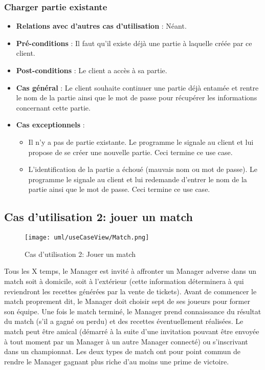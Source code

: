 \documentclass[a4paper,titlepage]{scrreprt}
\begin{document}
    \subsubsection{Charger partie existante}
      \begin{itemize}
        \item \textbf{Relations avec d'autres cas d'utilisation}  : Néant.
        \item \textbf{Pré-conditions} : Il faut qu’il existe déjà une partie à laquelle créée par ce client.
        \item \textbf{Post-conditions} : Le client a accès à sa partie.
        \item \textbf{Cas général} : Le client souhaite continuer une partie déjà entamée et rentre le nom de la partie ainsi que le mot de passe pour récupérer les informations concernant cette partie.
        \item \textbf{Cas exceptionnels} :
          \begin{itemize}
            \item Il n’y a pas de partie existante. Le programme le signale au client et lui propose de se créer une nouvelle partie. Ceci termine ce use case.
			\item L’identification de la partie a échoué (mauvais nom ou mot de passe). Le programme le signale au client et lui redemande d'entrer le nom de la partie ainsi que le mot de passe. Ceci termine ce use case.
          \end{itemize}
      \end{itemize}

  \subsection{Cas d'utilisation 2: jouer un match}
    \begin{figure}[H]
    \center
    \texttt{[image: uml/useCaseView/Match.png]}
    \caption{Cas d'utilisation 2: Jouer un match}
  \end{figure}	
    Tous les X temps, le Manager est invité à affronter un Manager adverse dans un \gls{match} soit à
    domicile, soit à l'extérieur (cette information déterminera à qui reviendront les recettes
    générées par la vente de tickets). Avant de commencer le match proprement dit,
    le Manager doit choisir sept de ses joueurs pour former son équipe. 
    Une fois le match terminé, le Manager prend connaissance du résultat du match 
    (s'il a gagné ou perdu) et des recettes éventuellement réalisées. Le match peut être amical (démarré à la suite d'une invitation pouvant être envoyée à tout moment par un Manager à un autre Manager connecté) ou s'inscrivant dans un championnat. Les deux types de match ont pour point commun de rendre le Manager gagnant plus riche d'au moins une prime de victoire.
\end{document}
